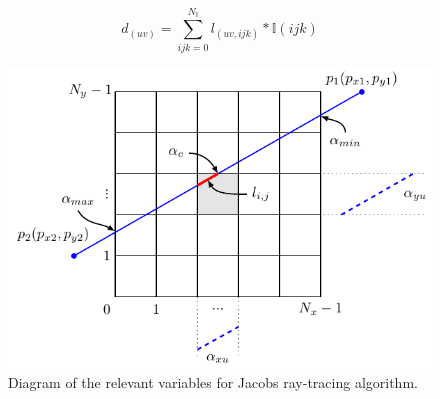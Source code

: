 \begin{equation}
d_{(uv)}= \sum_{ijk=0}^{N_\mathbb{I}}l_{(uv,ijk)}*\mathbb{I}(ijk)
\label{eq:ray-voxel}
\end{equation}


\begin{figure}
\begin{center}

\includegraphics{GPUmethods/Amatrix_siddon_diagram.pdf} 
\end{center}

\caption{\label{fig:Siddon} Diagram of the relevant variables for Jacobs ray-tracing algorithm.} 
\end{figure}



